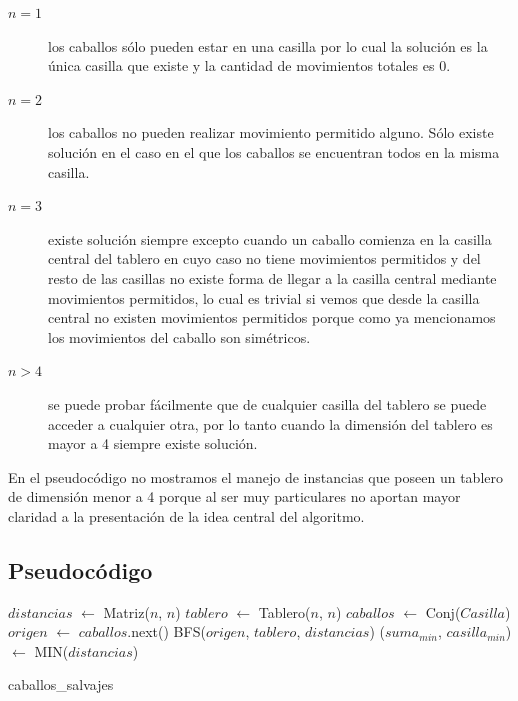 \begin{description}
  \item[$n = 1$] los caballos sólo pueden estar en una casilla por lo cual la solución es la única casilla
    que existe y la cantidad de movimientos totales es 0.
  \item[$n = 2$] los caballos no pueden realizar movimiento permitido alguno. Sólo existe solución en el caso
    en el que los caballos se encuentran todos en la misma casilla.
  \item[$n = 3$] existe solución siempre excepto cuando un caballo comienza en la casilla central del tablero
    en cuyo caso no tiene movimientos permitidos y del resto de las casillas no existe forma de llegar a la
    casilla central mediante movimientos permitidos, lo cual es trivial si vemos que desde la casilla central
    no existen movimientos permitidos porque como ya mencionamos los movimientos del caballo son simétricos.
  \item[$n > 4$] se puede probar fácilmente que de cualquier casilla del tablero se puede acceder a cualquier otra,
    por lo tanto cuando la dimensión del tablero es mayor a 4 siempre existe solución.
\end{description}
En el pseudocódigo no mostramos el manejo de instancias que poseen un tablero de dimensión menor a 4 porque
al ser muy particulares no aportan mayor claridad a la presentación de la idea central del algoritmo.

\subsection{Pseudocódigo}
\begin{algorithm}[H]
  \begin{algorithmic}
    \STATE $distancias$ $\gets$ Matriz($n$, $n$)
    \STATE $tablero$ $\gets$ Tablero($n$, $n$)
    \STATE $caballos$ $\gets$ Conj($Casilla$)
      \STATE $origen$ $\gets$ $caballos$.next()
      \STATE BFS($origen$, $tablero$, $distancias$)
    \ENDWHILE
    \STATE ($suma_{min}$, $casilla_{min}$) $\gets$ MIN($distancias$)
    \caption{caballos\_salvajes}
  \end{algorithmic}
\end{algorithm}

